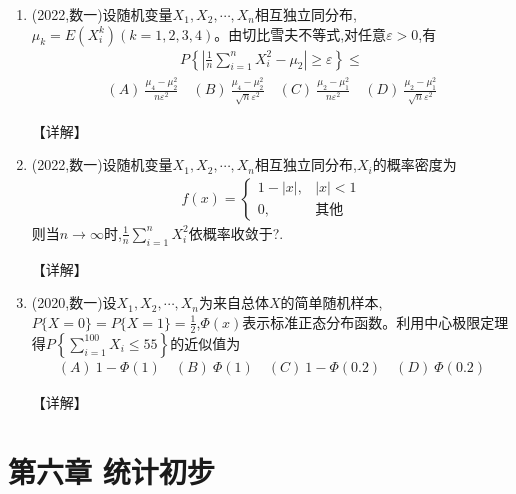 \documentclass[12pt, a4paper, oneside, UTF8]{ctexbook}
\begin{document}
\begin{enumerate}[label=\arabic*.]
    \item (2022,数一)设随机变量$X_1,X_2,\cdots,X_n$相互独立同分布,$\mu_k=E(X_i^k)(k=1,2,3,4)$。由切比雪夫不等式,对任意$\varepsilon>0$,有
    \begin{align*}
        P\left\{\left|\frac{1}{n}\sum_{i=1}^n X_i^2-\mu_2\right|\geq\varepsilon\right\}\leq
    \end{align*}
    \begin{align*}
        (A)\ \frac{\mu_4-\mu_2^2}{n\varepsilon^2} \quad (B)\ \frac{\mu_4-\mu_2^2}{\sqrt{n}\varepsilon^2} \quad (C)\ \frac{\mu_2-\mu_1^2}{n\varepsilon^2} \quad (D)\ \frac{\mu_2-\mu_1^2}{\sqrt{n}\varepsilon^2}
    \end{align*}
    
    \begin{solution}
    【详解】
    \end{solution}
    
    \item (2022,数一)设随机变量$X_1,X_2,\cdots,X_n$相互独立同分布,$X_i$的概率密度为
    \begin{align*}
        f(x)=\begin{cases}
            1-|x|, & |x|<1 \\
            0, & \text{其他}
        \end{cases}
    \end{align*}
    则当$n\rightarrow\infty$时,$\frac{1}{n}\sum_{i=1}^n X_i^2$依概率收敛于?.
    
    \begin{solution}
    【详解】
    \end{solution}
    
    \item (2020,数一)设$X_1,X_2,\cdots,X_n$为来自总体$X$的简单随机样本,$P\{X=0\}=P\{X=1\}=\frac{1}{2}$,$\Phi(x)$表示标准正态分布函数。利用中心极限定理得$P\left\{\sum_{i=1}^{100} X_i\leq 55\right\}$的近似值为
    \begin{align*}
        (A)\ 1-\Phi(1) \quad (B)\ \Phi(1) \quad (C)\ 1-\Phi(0.2) \quad (D)\ \Phi(0.2)
    \end{align*}
    
    \begin{solution}
    【详解】
    \end{solution}
\end{enumerate}

\section{第六章 统计初步}
\end{document}

